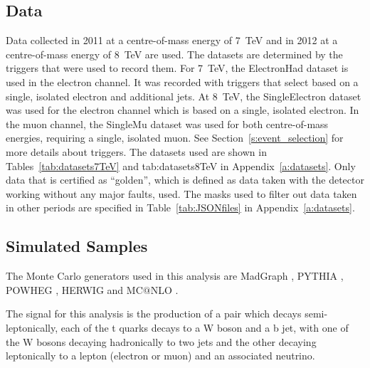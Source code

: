 \subsection{Data}
\label{ss:data}

Data collected in 2011 at a centre-of-mass energy of 7~TeV and in 2012 at a centre-of-mass energy of 8~TeV are
used. The datasets are determined by the triggers that were used to record them. For 7~TeV, the ElectronHad
dataset is used in the electron channel. It was recorded with triggers that select based on a single, isolated
electron and additional jets. At 8~TeV, the SingleElectron dataset was used for the electron channel which is
based on a single, isolated electron. In the muon channel, the SingleMu dataset was used for both
centre-of-mass energies, requiring a single, isolated muon. See Section~\ref{s:event_selection} for more
details about triggers. The datasets used are shown in Tables~\ref{tab:datasets7TeV} and {tab:datasets8TeV} in
Appendix~\ref{a:datasets}. Only data that is certified as “golden”, which is defined as data taken with the
detector working without any major faults, used. The masks used to filter out data taken in other periods are
specified in Table~\ref{tab:JSONfiles} in Appendix~\ref{a:datasets}.

\subsection{Simulated Samples}
\label{ss:simulated_samples}
The Monte Carlo generators used in this analysis are MadGraph \cite{madgraph}, PYTHIA \cite{pythia8}, POWHEG
\cite{powheg_Nason,powheg_Frixione,powheg_Alioli}, HERWIG \cite{herwig} and MC$@$NLO
\cite{mcatnlo_Frixione1, mcatnlo_Frixione2}.

The signal for this analysis is the production of a \ttbar pair which decays semi-leptonically, \ie each of
the t quarks decays to a W boson and a b jet, with one of the W bosons decaying hadronically to two jets and
the other decaying leptonically to a lepton (electron or muon) and an associated neutrino.

